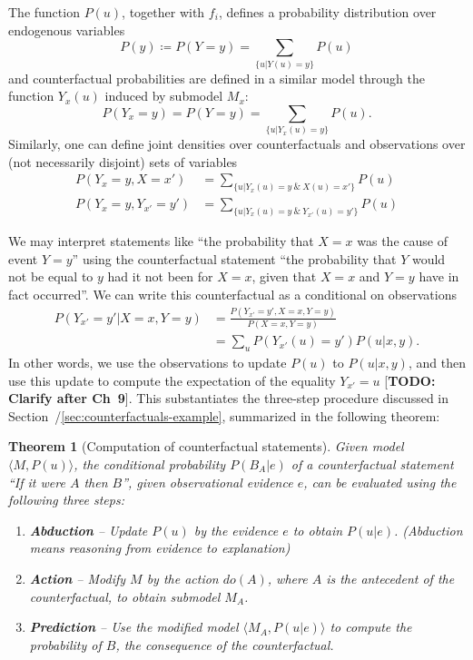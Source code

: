 \documentclass[11pt]{article}
\numberwithin{equation}{section}
\newcommand{\defeq}{\coloneqq}
\newtheorem{thm}{Theorem}[section]
\begin{document}
The function $P(u)$, together with $f_i$, defines a probability distribution over endogenous variables
\begin{equation}
P(y) \defeq P(Y=y) = \sum_{\{u|Y(u)=y\}} P(u)
\end{equation}
and counterfactual probabilities are defined in a similar model through the function $Y_x(u)$ induced by submodel $M_x$:
\begin{equation}
P(Y_x=y) = P(Y=y) = \sum_{\{u|Y_x(u)=y\}} P(u).
\end{equation}
Similarly, one can define joint densities over counterfactuals and observations over (not necessarily disjoint) sets of variables
\begin{align}
P(Y_x=y, X=x') &= \sum_{\{u|Y_x(u)=y\ \&\ X(u)=x'\}} P(u) \\
P(Y_x=y, Y_{x'}=y') &= \sum_{\{u|Y_x(u)=y\ \&\ Y_{x'}(u)=y'\}} P(u)
\end{align}

We may interpret statements like ``the probability that $X=x$ was the cause of event $Y=y$'' using the counterfactual statement ``the probability that $Y$ would not be equal to $y$ had it not been for $X=x$, given that $X=x$ and $Y=y$ have in fact occurred''. We can write this counterfactual as a conditional on observations
\begin{align}
P(Y_{x'}=y'| X=x, Y=y) &= \frac{P(Y_{x'}=y', X=x, Y=y)}{P(X=x, Y=y)} \\
&= \sum_u P(Y_{x'}(u) = y')P(u|x, y).
\end{align}
In other words, we use the observations to update $P(u)$ to $P(u|x,y)$, and then use this update to compute the expectation of the equality $Y_{x'}=u$ [\textbf{TODO: Clarify after Ch~9}]. This substantiates the three-step procedure discussed in Section~/\ref{sec:counterfactuals-example}, summarized in the following theorem:
\begin{thm}[Computation of counterfactual statements] \label{thm:comp-counterfactuals}
Given model $\langle M, P(u)\rangle$, the conditional probability $P(B_A|e)$ of a counterfactual statement ``If it were $A$ then $B$'', given observational evidence $e$, can be evaluated using the following three steps:
\begin{enumerate}[noitemsep]
\item \textbf{Abduction} -- Update $P(u)$ by the evidence $e$ to obtain $P(u|e)$. (Abduction means reasoning from evidence to explanation)
\item \textbf{Action} -- Modify $M$ by the action $do(A)$, where $A$ is the antecedent of the counterfactual, to obtain submodel $M_A$.
\item \textbf{Prediction} -- Use the modified model $\langle M_A, P(u|e)\rangle$ to compute the probability of $B$, the consequence of the counterfactual.
\end{enumerate}
\end{thm}
\end{document}
